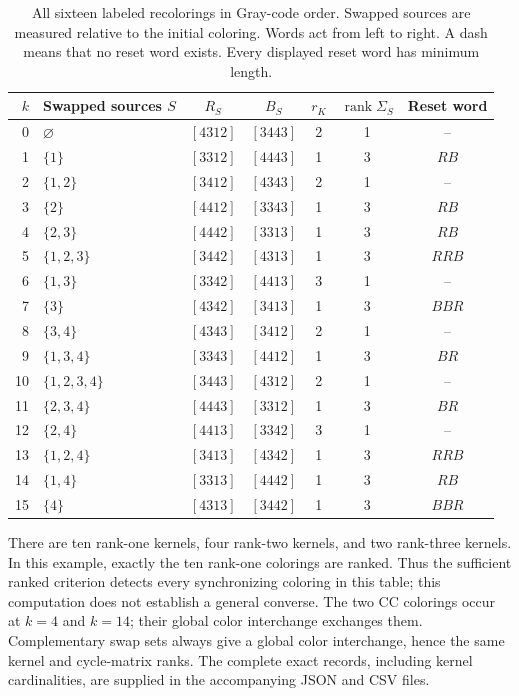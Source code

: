 \begin{table}[tbp]
\centering\small
\begin{tabular}{r l c c c c c}
\hline
$k$ & Swapped sources $S$ & $R_S$ & $B_S$ & $r_K$ & $\operatorname{rank}\Sigma_S$ & Reset word\\
\hline
0 & $\varnothing$ & $[4312]$ & $[3443]$ & 2 & 1 & $\text{--}$ \\
1 & $\{1\}$ & $[3312]$ & $[4443]$ & 1 & 3 & $RB$ \\
2 & $\{1,2\}$ & $[3412]$ & $[4343]$ & 2 & 1 & $\text{--}$ \\
3 & $\{2\}$ & $[4412]$ & $[3343]$ & 1 & 3 & $RB$ \\
4 & $\{2,3\}$ & $[4442]$ & $[3313]$ & 1 & 3 & $RB$ \\
5 & $\{1,2,3\}$ & $[3442]$ & $[4313]$ & 1 & 3 & $RRB$ \\
6 & $\{1,3\}$ & $[3342]$ & $[4413]$ & 3 & 1 & $\text{--}$ \\
7 & $\{3\}$ & $[4342]$ & $[3413]$ & 1 & 3 & $BBR$ \\
8 & $\{3,4\}$ & $[4343]$ & $[3412]$ & 2 & 1 & $\text{--}$ \\
9 & $\{1,3,4\}$ & $[3343]$ & $[4412]$ & 1 & 3 & $BR$ \\
10 & $\{1,2,3,4\}$ & $[3443]$ & $[4312]$ & 2 & 1 & $\text{--}$ \\
11 & $\{2,3,4\}$ & $[4443]$ & $[3312]$ & 1 & 3 & $BR$ \\
12 & $\{2,4\}$ & $[4413]$ & $[3342]$ & 3 & 1 & $\text{--}$ \\
13 & $\{1,2,4\}$ & $[3413]$ & $[4342]$ & 1 & 3 & $RRB$ \\
14 & $\{1,4\}$ & $[3313]$ & $[4442]$ & 1 & 3 & $RB$ \\
15 & $\{4\}$ & $[4313]$ & $[3442]$ & 1 & 3 & $BBR$ \\

\hline
\end{tabular}
\caption{All sixteen labeled recolorings in Gray-code order. Swapped
sources are measured relative to the initial coloring. Words act from
left to right. A dash means that no reset word exists. Every displayed
reset word has minimum length.}
\label{tab:four-state-all-recolorings}
\end{table}

There are ten rank-one kernels, four rank-two kernels, and two rank-three
kernels. In this example, exactly the ten rank-one colorings are ranked.
Thus the sufficient ranked criterion detects every synchronizing coloring
in this table; this computation does not establish a general converse.
The two CC colorings occur at $k=4$ and $k=14$; their global color
interchange exchanges them. Complementary swap sets always give a global
color interchange, hence the same kernel and cycle-matrix ranks.
The complete exact records, including kernel cardinalities, are supplied
in the accompanying JSON and CSV files.
